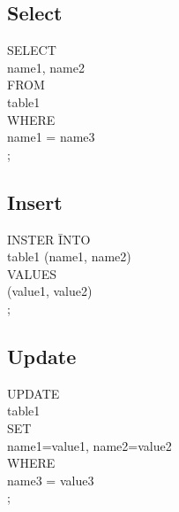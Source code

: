 \documentclass[11pt,twoside,a4paper]{article}
\begin{document}
     \subsection{Select}
    	  \begin{tabbing}
    	    SELECT \= \\
    	    \>name1, name2                \\
    	    FROM                          \\
    	    \>table1                      \\
    	    WHERE                         \\
    	    \>name1 = name3               \\
      		;
      	\end{tabbing}
    
    \subsection{Insert}
    	  \begin{tabbing}
    	    INSTER \= INTO                \\
    	    \>table1 (name1, name2)       \\
    	    VALUES                        \\
    	    \>(value1, value2)            \\
      		;
      	\end{tabbing}
     
     \subsection{Update}
    	  \begin{tabbing}
    	    UPDATE \=                    \\
    	    \>table1                      \\
    	    SET                           \\
    	    \>name1=value1, name2=value2  \\
    	    WHERE                         \\
    	    \>name3 = value3              \\
      		;
      	\end{tabbing}
     
\end{document}

